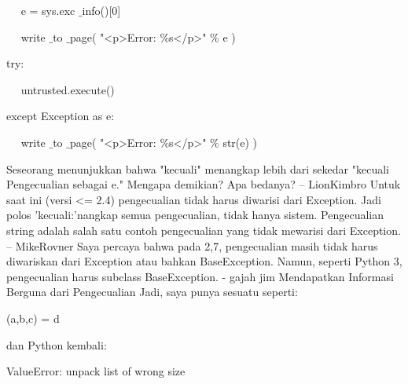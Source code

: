 \vspace{10pt}


{\fontsize{10pt}{10pt}\selectfont ~~ e = sys.exc $  \_  $info()[0]} 

\vspace{10pt}


{\fontsize{10pt}{10pt}\selectfont ~~ write $  \_  $to $  \_  $page( "<p>Error:  $  \%  $s</p>"  $  \%  $ e )} 
\vspace{16pt}


{\fontsize{10pt}{10pt}\selectfont  try:}

\vspace{10pt}
 
 
{\fontsize{10pt}{10pt}\selectfont ~~ untrusted.execute()} 

\vspace{10pt}

 
{\fontsize{10pt}{10pt}\selectfont  except Exception as e:} 

\vspace{10pt}

 
{\fontsize{10pt}{10pt}\selectfont ~~ write $  \_  $to $  \_  $page( "<p>Error:  $  \%  $s</p>"  $  \%  $ str(e) )} 
\vspace{16pt}

 \hspace*{0.64in} Seseorang menunjukkan bahwa "kecuali" menangkap lebih dari sekedar "kecuali Pengecualian sebagai e." Mengapa demikian? Apa bedanya? – LionKimbro Untuk saat ini (versi <= 2.4) pengecualian tidak harus diwarisi dari Exception. Jadi polos 'kecuali:'nangkap semua pengecualian, tidak hanya sistem. Pengecualian string adalah salah satu contoh pengecualian yang tidak mewarisi dari Exception. – MikeRovner Saya percaya bahwa pada 2,7, pengecualian masih tidak harus diwariskan dari Exception atau bahkan BaseException. Namun, seperti Python 3, pengecualian harus subclass BaseException. - gajah jim Mendapatkan Informasi Berguna dari Pengecualian Jadi, saya punya sesuatu seperti: 
 
\vspace{12pt}


{\fontsize{10pt}{10pt}\selectfont  (a,b,c) = d} 

\vspace{12pt}
 
dan Python kembali: 
 
\vspace{12pt}
 
 
{\fontsize{10pt}{10pt}\selectfont  ValueError: unpack list of wrong size} 
\vspace{16pt}

